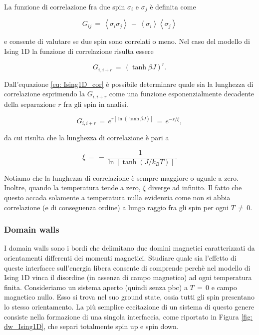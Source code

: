 La funzione di correlazione fra due spin $\sigma_i$ e $\sigma_j$ è definita come

\begin{equation}
    G_{ij}\,=\,\left<\sigma_i \sigma_j\right>\,-\,\left<\sigma_i\right>\left<\sigma_j\right>
    \label{eq: def_corr_fun_Ising1D}
\end{equation}

e consente di valutare se due spin sono correlati o meno. Nel caso del modello di Ising 1D la funzione di correlazione 
risulta essere

\begin{equation}
    G_{i, i+r}\,=\,\left(\tanh{\beta J}\right)^r.
    \label{eq: Ising1D_cor}
\end{equation}

Dall'equazione \eqref{eq: Ising1D_cor} è possibile determinare quale sia la lunghezza di correlazione esprimendo la 
$G_{i, i+r}$ come una funzione esponenzialmente decadente della separazione $r$ fra gli spin in analisi. 

\begin{equation}
    G_{i, i+r}\,=\,e^{r\left[\ln{\left(\tanh{\beta J}\right)}\right]}\,=\,e^{-r/\xi},
    \label{eq: Ising1D_corr_exp}
\end{equation}

da cui risulta che la lunghezza di correlazione è pari a 

\begin{equation}
    \xi\,=\,-\frac{1}{\ln{\left[\tanh{\left(J/k_B T\right)}\right]}}.
    \label{eq: lungh_corr}
\end{equation}

Notiamo che la lunghezza di correlazione è sempre maggiore o uguale a zero. Inoltre, quando la temperatura tende a zero, 
$\xi$ diverge ad infinito. Il fatto che questo accada solamente a temperatura nulla evidenzia come non si abbia correlazione 
(e di conseguenza ordine) a lungo raggio fra gli spin per ogni $T\,\neq\,0$.



\subsubsection{Domain walls}

I domain walls sono i bordi che delimitano due domini magnetici caratterizzati da orientamenti differenti dei momenti magnetici. 
Studiare quale sia l'effetto di queste interfacce sull'energia libera consente di comprende perchè nel modello di Ising 1D vinca il 
disordine (in assenza di campo magnetico) ad ogni temperatura finita. Consideriamo un sistema aperto (quindi senza pbc) a $T\,=\,0$ 
e campo magnetico nullo. Esso si trova nel suo ground state, ossia tutti gli spin presentano lo stesso orientamento. La più semplice 
eccitazione di un sistema di questo genere consiste nella formazione di una singola interfaccia, come riportato in Figura 
\ref{fig: dw_Ising1D}, che separi totalmente spin up e spin down.


